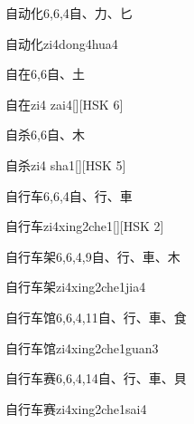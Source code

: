 \begin{Entry}{自动化}{6,6,4}{⾃、⼒、⼔}
  \begin{Phonetics}{自动化}{zi4dong4hua4}
  \end{Phonetics}
\end{Entry}

\begin{Entry}{自在}{6,6}{⾃、⼟}
  \begin{Phonetics}{自在}{zi4 zai4}[][HSK 6]
  \end{Phonetics}
\end{Entry}

\begin{Entry}{自杀}{6,6}{⾃、⽊}
  \begin{Phonetics}{自杀}{zi4 sha1}[][HSK 5]
  \end{Phonetics}
\end{Entry}

\begin{Entry}{自行车}{6,6,4}{⾃、⾏、⾞}
  \begin{Phonetics}{自行车}{zi4xing2che1}[][HSK 2]
  \end{Phonetics}
\end{Entry}

\begin{Entry}{自行车架}{6,6,4,9}{⾃、⾏、⾞、⽊}
  \begin{Phonetics}{自行车架}{zi4xing2che1jia4}
  \end{Phonetics}
\end{Entry}

\begin{Entry}{自行车馆}{6,6,4,11}{⾃、⾏、⾞、⾷}
  \begin{Phonetics}{自行车馆}{zi4xing2che1guan3}
  \end{Phonetics}
\end{Entry}

\begin{Entry}{自行车赛}{6,6,4,14}{⾃、⾏、⾞、⾙}
  \begin{Phonetics}{自行车赛}{zi4xing2che1sai4}
  \end{Phonetics}
\end{Entry}

